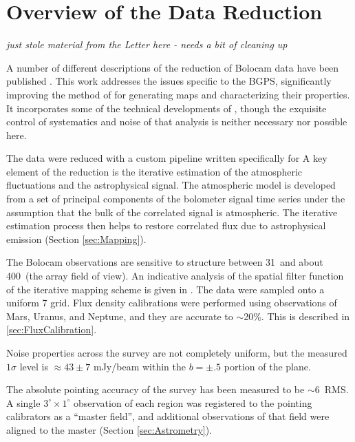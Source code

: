 \documentclass[12pt,preprint]{aastex}
\begin{document}
\section{Overview of the Data Reduction}
\label{sec:Overview}

{\it just stole material from the Letter here - needs a bit of cleaning up}

A number of different descriptions of the reduction of Bolocam data
have been published \citep{laurent05,enoch06,sayers09}.  This work
addresses the issues specific to the BGPS, significantly improving the
method of \citet{enoch06} for generating maps and characterizing their
properties.  It incorporates some of the technical developments
of \citet{sayers09}, though the exquisite control of systematics and
noise of that analysis is neither necessary nor possible here.

The data were reduced with a custom pipeline written specifically for
A key element of the reduction is the iterative estimation of the
atmospheric fluctuations and the astrophysical signal.  The
atmospheric model is developed from a set of principal components of
the bolometer signal time series under the assumption that the bulk of
the correlated signal is atmospheric.  The iterative estimation
process then helps to restore correlated flux due to astrophysical
emission (Section \ref{sec:Mapping}).

The Bolocam observations are sensitive to structure between 31\arcsec\
and about 400\arcsec\ (the array field of view).  An indicative
analysis of the spatial filter function of the iterative mapping
scheme is given in \citet{enoch06}.  The data were sampled onto a
uniform 7\farcs2 grid.  Flux density calibrations were performed using
observations of Mars, Uranus, and Neptune, and they are accurate to
$\sim$20\%.  This is described in \ref{sec:FluxCalibration}.

Noise properties across the survey are not completely uniform, but the
measured $1\sigma$ level is $\approx43\pm7$ mJy/beam within the
$b=\pm.5$ portion of the plane.

The absolute pointing accuracy of the survey has been measured to be
$\sim$6\arcsec\ RMS.  A single $3^\circ \times 1^\circ$ observation of
each region was registered to the pointing calibrators as a ``master
field'', and additional observations of that field were aligned to the
master (Section \ref{sec:Astrometry}).
\end{document}
